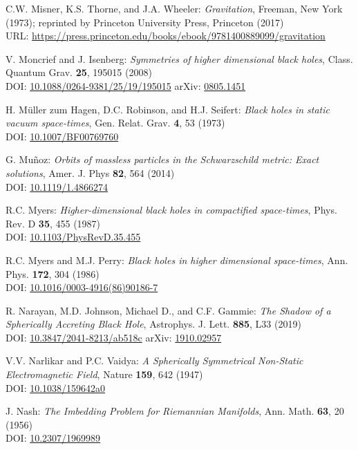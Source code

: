 \begin{thebibliography}{123}
C.W. Misner, K.S. Thorne, and J.A. Wheeler:
{\em Gravitation},
Freeman, New York (1973);
reprinted by Princeton University Press, Princeton (2017)\\
URL: \url{https://press.princeton.edu/books/ebook/9781400889099/gravitation}

V. Moncrief and J. Isenberg:
{\em Symmetries of higher dimensional black holes},
Class. Quantum Grav. {\bf 25}, 195015 (2008)\\
DOI: \href{https://doi.org/10.1088/0264-9381/25/19/195015}{10.1088/0264-9381/25/19/195015}\hfill
arXiv: \href{https://arxiv.org/abs/0805.1451}{0805.1451}

H. Müller zum Hagen, D.C. Robinson, and H.J. Seifert:
{\em Black holes in static vacuum space-times},
Gen. Relat. Grav. {\bf 4}, 53 (1973)\\
DOI: \href{https://doi.org/10.1007/BF00769760}{10.1007/BF00769760}

G. Mu\~noz:
{\em Orbits of massless particles in the Schwarzschild metric: Exact solutions},
Amer. J. Phys {\bf 82}, 564 (2014)\\
DOI: \href{https://doi.org/10.1119/1.4866274}{10.1119/1.4866274}

R.C. Myers:
{\em Higher-dimensional black holes in compactified space-times},
Phys. Rev. D {\bf 35}, 455 (1987)\\
DOI: \href{https://doi.org/10.1103/PhysRevD.35.455}{10.1103/PhysRevD.35.455}

R.C. Myers and M.J. Perry:
{\em Black holes in higher dimensional space-times},
Ann. Phys. {\bf 172}, 304 (1986)\\
DOI: \href{https://doi.org/10.1016/0003-4916(86)90186-7}{10.1016/0003-4916(86)90186-7}

R. Narayan, M.D. Johnson, Michael D., and C.F. Gammie:
{\em The Shadow of a Spherically Accreting Black Hole},
Astrophys. J. Lett. {\bf 885}, L33 (2019)\\
DOI: \href{https://doi.org/10.3847/2041-8213/ab518c}{10.3847/2041-8213/ab518c}\hfill
arXiv: \href{https://arxiv.org/abs/1910.02957}{1910.02957}

V.V. Narlikar and P.C. Vaidya:
{\em A Spherically Symmetrical Non-Static Electromagnetic Field},
Nature {\bf 159}, 642 (1947) \\
DOI: \href{https://doi.org/10.1038/159642a0}{10.1038/159642a0}

J. Nash:
{\em The Imbedding Problem for Riemannian Manifolds},
Ann. Math. {\bf 63}, 20 (1956)\\
DOI: \href{https://doi.org/10.2307/1969989}{10.2307/1969989}


\end{thebibliography}
